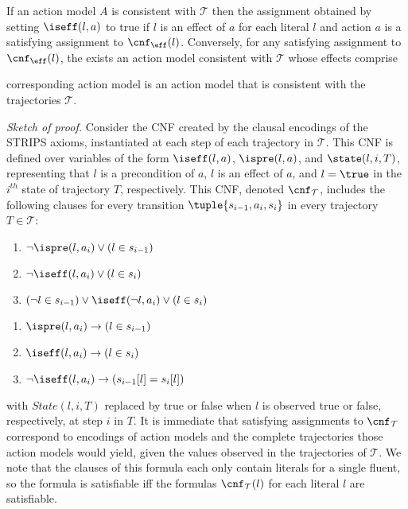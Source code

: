 \begin{lemma}
If an action model $A$ is consistent with $\mathcal{T}$
then the assignment obtained by setting $\iseff(l,a)$ to true if $l$ is an effect of $a$ for each literal $l$ and action $a$ is a satisfying assignment to $\cnf_{\eff}(l)$. 
Conversely, for any satisfying assignment to $\cnf_{\eff}(l)$, the exists an action model consistent with $\mathcal{T}$ whose effects comprise 

corresponding action model is an action model that is consistent with the trajectories $\mathcal{T}$.
\label{lem:cnf-char}
\end{lemma}
\noindent
{\em Sketch of proof.}
Consider the CNF created by the clausal encodings of the STRIPS axioms, instantiated at each step of each trajectory in $\mathcal{T}$. 
This CNF is defined over variables of the form $\iseff(l,a)$, $\ispre(l,a)$, and $\state(l,i,T)$, representing that 
$l$ is a precondition of $a$, 
$l$ is an effect of $a$, 
and $l=\true$ in the $i^{th}$ state of trajectory $T$, respectively.  
This CNF, denoted $\cnf_{\mathcal{T}}$, includes the following clauses for every transition $\tuple{s_{i-1},a_i,s_i}$ in every trajectory $T\in\mathcal{T}$:
\begin{enumerate}
\item $\neg \ispre(l,a_i)\vee (l\in s_{i-1})$
\item $\neg \iseff(l,a_i)\vee (l\in s_i)$
\item $(\neg l\in s_{i-1})\vee \iseff(\neg l,a_i)\vee (l\in s_i)$
\end{enumerate}
\begin{enumerate}
\item $\ispre(l,a_i)\rightarrow (l\in s_{i-1})$
\item $\iseff(l,a_i)\rightarrow (l\in s_i)$
\item $\neg\iseff(l,a_i)\rightarrow (s_{i-1}[l]=s_i[l])$
\end{enumerate}
with $State(l,i,T)$ replaced by true or false when $l$ is observed true or false, respectively, at step $i$ in $T$. 
It is immediate that satisfying assignments to $\cnf_{\mathcal{T}}$ correspond to encodings of action models and the complete trajectories those action models would yield, given the values observed in the trajectories of $\mathcal{T}$. We note that the clauses of this formula each only contain literals for a single fluent, so the formula is satisfiable iff the formulas $\cnf_{\mathcal{T}}(l)$ for each literal $l$ are satisfiable.

